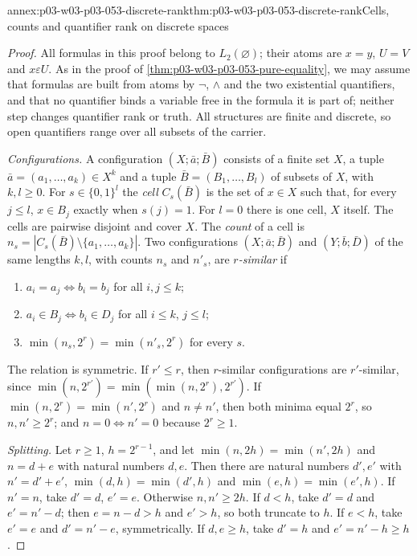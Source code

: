\begin{annexitem}{annex:p03-w03-p03-053-discrete-rank}{thm:p03-w03-p03-053-discrete-rank}{Cells, counts and quantifier rank on discrete spaces}
\begin{proof}
All formulas in this proof belong to \(L_2(\varnothing)\); their atoms are
\(x=y\), \(U=V\) and \(x\varepsilon U\). As in the proof of
\cref{thm:p03-w03-p03-053-pure-equality}, we may assume that formulas are
built from atoms by \(\neg\), \(\land\) and the two existential
quantifiers, and that no quantifier binds a variable free in the formula
it is part of; neither step changes quantifier rank or truth. All
structures are finite and discrete, so open quantifiers range over all
subsets of the carrier.

\emph{Configurations.} A configuration \((X;\bar a;\bar B)\) consists of a
finite set \(X\), a tuple \(\bar a=(a_1,\ldots,a_k)\in X^k\) and a tuple
\(\bar B=(B_1,\ldots,B_l)\) of subsets of \(X\), with \(k,l\ge0\). For
\(s\in\{0,1\}^l\) the \emph{cell} \(C_s(\bar B)\) is the set of
\(x\in X\) such that, for every \(j\le l\), \(x\in B_j\) exactly when
\(s(j)=1\). For \(l=0\) there is one cell, \(X\) itself. The cells are
pairwise disjoint and cover \(X\). The \emph{count} of a cell is
\(n_s=|C_s(\bar B)\setminus\{a_1,\ldots,a_k\}|\). Two configurations
\((X;\bar a;\bar B)\) and \((Y;\bar b;\bar D)\) of the same lengths
\(k,l\), with counts \(n_s\) and \(n'_s\), are \emph{\(r\)-similar} if
\begin{enumerate}
\item[(a)] \(a_i=a_j\iff b_i=b_j\) for all \(i,j\le k\);
\item[(b)] \(a_i\in B_j\iff b_i\in D_j\) for all \(i\le k\), \(j\le l\);
\item[(c)] \(\min(n_s,2^r)=\min(n'_s,2^r)\) for every \(s\).
\end{enumerate}
The relation is symmetric. If \(r'\le r\), then \(r\)-similar
configurations are \(r'\)-similar, since \(\min(n,2^{r'})=
\min(\min(n,2^r),2^{r'})\). If \(\min(n,2^r)=\min(n',2^r)\) and
\(n\neq n'\), then both minima equal \(2^r\), so \(n,n'\ge2^r\); and
\(n=0\iff n'=0\) because \(2^r\ge1\).

\emph{Splitting.} Let \(r\ge1\), \(h=2^{r-1}\), and let
\(\min(n,2h)=\min(n',2h)\) and \(n=d+e\) with natural numbers \(d,e\). Then
there are natural numbers \(d',e'\) with \(n'=d'+e'\),
\(\min(d,h)=\min(d',h)\) and \(\min(e,h)=\min(e',h)\). If \(n'=n\), take
\(d'=d\), \(e'=e\). Otherwise \(n,n'\ge2h\). If \(d<h\), take \(d'=d\) and
\(e'=n'-d\); then \(e=n-d>h\) and \(e'>h\), so both truncate to \(h\). If
\(e<h\), take \(e'=e\) and \(d'=n'-e\), symmetrically. If \(d,e\ge h\),
take \(d'=h\) and \(e'=n'-h\ge h\).


\end{proof}
\end{annexitem}
